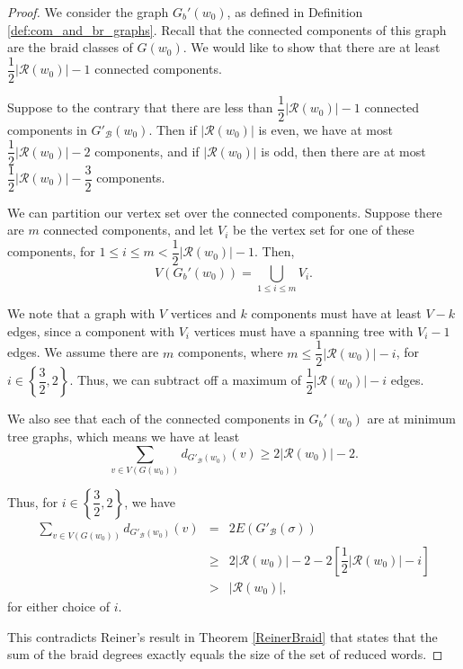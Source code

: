 \documentclass[11pt,reqno]{amsart}
\theoremstyle{definition}
\theoremstyle{notation}
\newcommand{\calR}{\mathcal{R}}
\newcommand{\calB}{\mathcal{B}}
\begin{document}
\begin{proof}
We consider the graph $G_b'(w_0)$, as defined in Definition \ref{def:com_and_br_graphs}. Recall that the connected components of this graph are the braid classes of $G(w_0)$. We would like to show that there are at least $ \dfrac{1}{2}|\calR(w_0)|-1$ connected components. 

Suppose to the contrary that there are less than $ \dfrac{1}{2}|\calR(w_0)|-1$ connected components in $G'_\calB(w_0)$. Then if $|\calR(w_0)|$ is even, we have at most $\dfrac{1}{2}|\calR(w_0)|-2$ components, and if $ |\calR(w_0)|$ is odd, then there are at most $ \dfrac{1}{2}|\calR(w_0)| -\dfrac{3}{2}$ components.  



We can partition our vertex set over the connected components. Suppose there are $m$ connected components, and let $V_i$ be the vertex set for one of these components, for $1\leq i\leq m<\dfrac{1}{2}|\calR(w_0)|-1$. Then, 
\[
V(G_b'(w_0)) = \bigcup_{1\leq i \leq m} V_i.
\]

We note that a graph with $V$ vertices and $k$ components must have at least $V-k$ edges, since a component with $V_i$ vertices must have a spanning tree with $V_i-1$ edges. We assume there are $m$ components, where $m\leq \dfrac{1}{2}|\calR(w_0)|-i$, for $i\in \left \{ \dfrac{3}{2}, 2 \right \}$. Thus, we can subtract off a maximum of $\dfrac{1}{2}|\calR(w_0)|-i$ edges.

We also see that each of the connected components in $G_b'(w_0)$ are at minimum tree graphs, which means we have at least
\[
\sum_{v\in V(G(w_0))} d_{G'_\calB(w_0)}(v) \geq 2|\calR(w_0)|-2.
\]

Thus, for $i\in \left \{\dfrac{3}{2}, 2 \right \}$, we have
\begin{eqnarray*}
\sum_{v\in V(G(w_0))} d_{G'_\calB(w_0)}(v) &=& 2E(G'_\calB(\sigma))\\
&\geq & 2|\calR(w_0)|-2 - 2\left [ \dfrac{1}{2}|\calR(w_0)| - i \right ] \\
&>& |\calR(w_0)|,
\end{eqnarray*}
for either choice of $i$.

This contradicts Reiner's result in Theorem \ref{ReinerBraid} that states that the sum of the braid degrees exactly equals the size of the set of reduced words. 
\end{proof}
\end{document}
